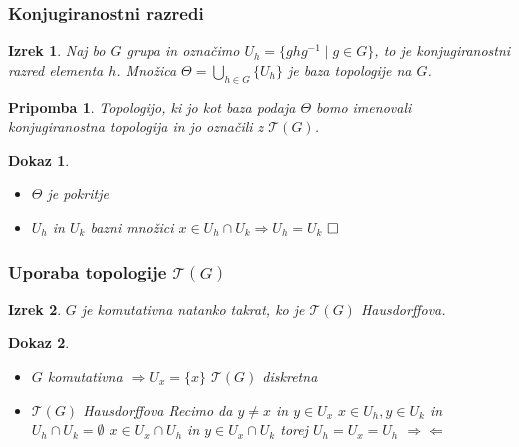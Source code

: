 \documentclass{beamer}
\def\qed{$\hfill\Box$}   %
\newtheorem{izrek}{Izrek}
\newtheorem{pripomba}{Pripomba}
\newtheorem{dokaz}{Dokaz}
\begin{document}
\begin{frame}
\frametitle{Konjugiranostni razredi}

\begin{izrek}
    Naj bo $G$ grupa in označimo $U_h = \{ghg^{-1} \mid g \in G \}$, to je konjugiranostni razred elementa $h$.
    \pause
    Množica $\Theta = \bigcup_{h \in G}\{U_h\}$ je baza topologije na $G$.
    \pause
\end{izrek}


\begin{pripomba}
    Topologijo, ki jo kot baza podaja $\Theta$ bomo imenovali \emph{konjugiranostna topologija} in jo označili z $\mathcal{T}(G)$.
    \pause
\end{pripomba}

\begin{dokaz}
    \begin{itemize}
        \item $\Theta$ je pokritje
        \pause
        \item$U_h$ in $U_k$ bazni množici
        \newline
        \pause
        $x \in U_h \cap U_k \Rightarrow U_h = U_k$
        \pause
        \qed
    \end{itemize}
\end{dokaz}

\end{frame}


\begin{frame}
\frametitle{Uporaba topologije $\mathcal{T}(G)$}

\begin{izrek}
    $G$ je komutativna natanko takrat, ko je $\mathcal{T}(G)$ Hausdorffova.
    \pause
\end{izrek}

\begin{dokaz}
    \begin{itemize}
        \item[($\Rightarrow$)] $G$ komutativna $\Rightarrow U_x = \{x\}$
        \newline
        \pause
        $\mathcal{T}(G)$ diskretna
        \bigskip
        \item[($\Leftarrow$)] $\mathcal{T}(G)$ Hausdorffova
        \newline
        \pause
        Recimo da $y \neq x$ in $y \in U_x$
        \newline
        \pause
        $x \in U_h, y \in U_k$ in $U_h \cap U_k = \emptyset$
        \newline
        \pause
        $x \in U_x \cap U_h$ in $y \in U_x \cap U_k$ torej $U_h = U_x = U_h$
        \pause
        $\Rightarrow\!\Leftarrow$
    \end{itemize}
\end{dokaz}

\end{frame}
\end{document}

